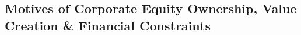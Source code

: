 \documentclass[12pt]{article}
\begin{document}




\subsection{Motives of Corporate Equity Ownership, Value Creation \& Financial Constraints}
\end{document}
